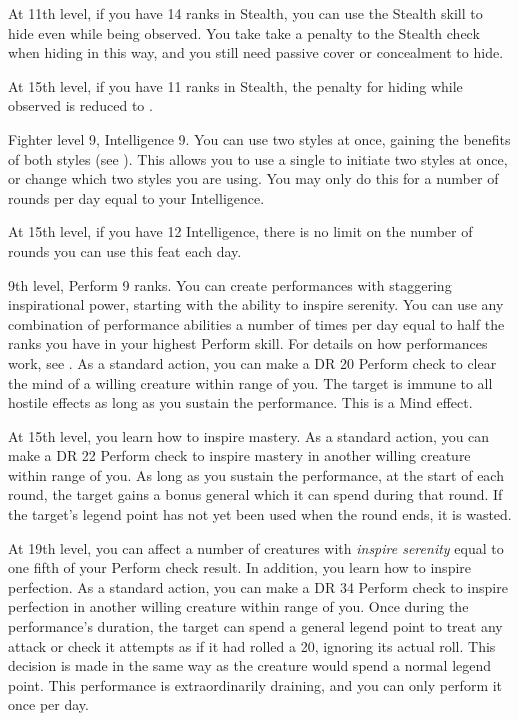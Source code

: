     At 11th level, if you have 14 ranks in Stealth, you can use the Stealth skill to hide even while being observed.
    You take take a  penalty to the Stealth check when hiding in this way, and you still need passive cover or concealment to hide.

    At 15th level, if you have 11 ranks in Stealth, the penalty for hiding while observed is reduced to .

    \featpre Fighter level 9, Intelligence 9.
    \featben You can use two styles at once, gaining the benefits of both styles (see ).
    This allows you to use a single  to initiate two styles at once, or change which two styles you are using.
    You may only do this for a number of rounds per day equal to your Intelligence.

    At 15th level, if you have 12 Intelligence, there is no limit on the number of rounds you can use this feat each day.

    \featpres 9th level, Perform 9 ranks.
    \featben You can create performances with staggering inspirational power, starting with the ability to inspire serenity.
    You can use any combination of performance abilities a number of times per day equal to half the ranks you have in your highest Perform skill.
    For details on how performances work, see .
     As a standard action, you can make a DR 20 Perform check to clear the mind of a willing creature within \rngmed range of you.
    The target is immune to all hostile  effects as long as you sustain the performance.
    This is a Mind effect.

    At 15th level, you learn how to inspire mastery.
     As a standard action, you can make a DR 22 Perform check to inspire mastery in another willing creature within \rngmed range of you.
    As long as you sustain the performance, at the start of each round, the target gains a bonus general  which it can spend during that round.
    If the target's legend point has not yet been used when the round ends, it is wasted.

    At 19th level, you can affect a number of creatures with \textit{inspire serenity} equal to one fifth of your Perform check result.
    In addition, you learn how to inspire perfection.
     As a standard action, you can make a DR 34 Perform check to inspire perfection in another willing creature within \rngmed range of you.
    Once during the performance's duration, the target can spend a general legend point to treat any attack or check it attempts as if it had rolled a 20, ignoring its actual roll.
    This decision is made in the same way as the creature would spend a normal legend point.
    This performance is extraordinarily draining, and you can only perform it once per day.

